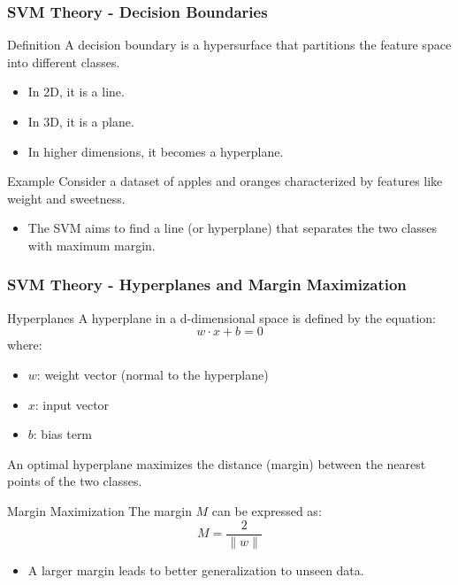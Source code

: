 \documentclass[aspectratio=169]{beamer}
\begin{document}
\begin{frame}[fragile]
    \frametitle{SVM Theory - Decision Boundaries}
    \begin{block}{Definition}
        A decision boundary is a hypersurface that partitions the feature space into different classes.
        \begin{itemize}
            \item In 2D, it is a line.
            \item In 3D, it is a plane.
            \item In higher dimensions, it becomes a hyperplane.
        \end{itemize}
    \end{block}
    
    \begin{block}{Example}
        Consider a dataset of apples and oranges characterized by features like weight and sweetness.
        \begin{itemize}
            \item The SVM aims to find a line (or hyperplane) that separates the two classes with maximum margin.
        \end{itemize}
    \end{block}
\end{frame}

\begin{frame}[fragile]
    \frametitle{SVM Theory - Hyperplanes and Margin Maximization}
    \begin{block}{Hyperplanes}
        A hyperplane in a d-dimensional space is defined by the equation:
        \begin{equation}
            w \cdot x + b = 0
        \end{equation}
        where:
        \begin{itemize}
            \item \( w \): weight vector (normal to the hyperplane)
            \item \( x \): input vector
            \item \( b \): bias term
        \end{itemize}
        
        An optimal hyperplane maximizes the distance (margin) between the nearest points of the two classes.
    \end{block}
    
    \begin{block}{Margin Maximization}
        The margin \( M \) can be expressed as:
        \begin{equation}
            M = \frac{2}{\|w\|}
        \end{equation}
        \begin{itemize}
            \item A larger margin leads to better generalization to unseen data.
        \end{itemize}
    \end{block}
\end{frame}
\end{document}
